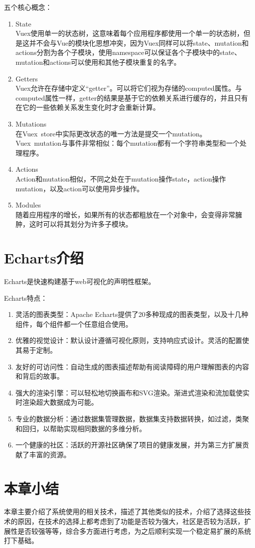 五个核心概念：

\begin{enumerate}
  \item State\\
        Vuex使用单一的状态树，这意味着每个应用程序都使用一个单一的状态树，但是这并不会与Vue的模块化思想冲突，因为Vuex同样可以将state、mutation和actions分割为各个子模块，使用namespace可以保证各个子模块中的state、mutation和actions可以使用和其他子模块重复的名字。
  \item Getters\\
        Vuex允许在存储中定义“getter”。可以将它们视为存储的computed属性。与computed属性一样，getter的结果是基于它的依赖关系进行缓存的，并且只有在它的一些依赖关系发生变化时才会重新计算。
  \item Mutations\\
        在Vuex~store中实际更改状态的唯一方法是提交一个mutation。Vuex~mutation与事件非常相似：每个mutation都有一个字符串类型和一个处理程序。
  \item Actions\\
        Action和mutation相似，不同之处在于mutation操作state，action操作mutation，以及action可以使用异步操作。
  \item Modules\\
        随着应用程序的增长，如果所有的状态都粗放在一个对象中，会变得非常臃肿，这时可以将其划分为许多子模块。
\end{enumerate}

\section{Echarts介绍}

Echarts是快速构建基于web可视化的声明性框架。

Echarts特点：
\begin{enumerate}
  \item 灵活的图表类型：Apache Echarts提供了20多种现成的图表类型，以及十几种组件，每个组件都一个任意组合使用。
  \item 优雅的视觉设计：默认设计遵循可视化原则，支持响应式设计。灵活的配置使其易于定制。
  \item 友好的可访问性：自动生成的图表描述帮助有阅读障碍的用户理解图表的内容和背后的故事。
  \item 强大的渲染引擎：可以轻松地切换画布和SVG渲染。渐进式渲染和流加载使实时渲染超大数据成为可能。
  \item 专业的数据分析：通过数据集管理数据，数据集支持数据转换，如过滤，类聚和回归，以帮助实现相同数据的多维分析。
  \item 一个健康的社区：活跃的开源社区确保了项目的健康发展，并为第三方扩展贡献了丰富的资源。
\end{enumerate}

\section{本章小结}

本章主要介绍了系统使用的相关技术，描述了其他类似的技术，介绍了选择这些技术的原因，在技术的选择上都考虑到了功能是否较为强大，社区是否较为活跃，扩展性是否较强等等，综合多方面进行考虑，为之后顺利实现一个稳定易扩展的系统打下基础。